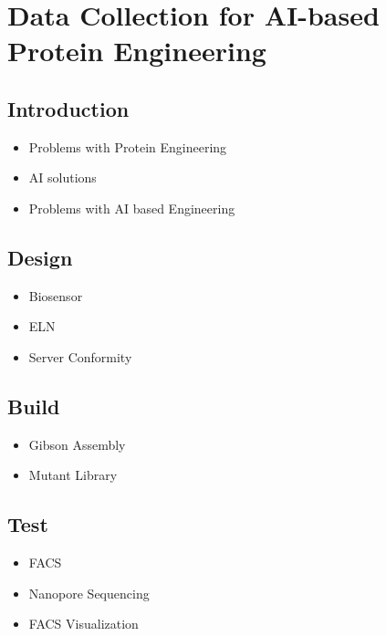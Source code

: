 \documentclass[
  letterpaper,
]{book}
\begin{document}

\chapter{Data Collection for AI-based Protein
Engineering}\label{data-collection-for-ai-based-protein-engineering}

\section{Introduction}\label{introduction-2}

\begin{itemize}
\item
  Problems with Protein Engineering
\item
  AI solutions
\item
  Problems with AI based Engineering
\end{itemize}

\section{Design}\label{design}

\begin{itemize}
\item
  Biosensor
\item
  ELN
\item
  Server Conformity
\end{itemize}

\section{Build}\label{build}

\begin{itemize}
\item
  Gibson Assembly
\item
  Mutant Library
\end{itemize}

\section{Test}\label{test}

\begin{itemize}
\item
  FACS
\item
  Nanopore Sequencing
\item
  FACS Visualization
\end{itemize}
\end{document}
